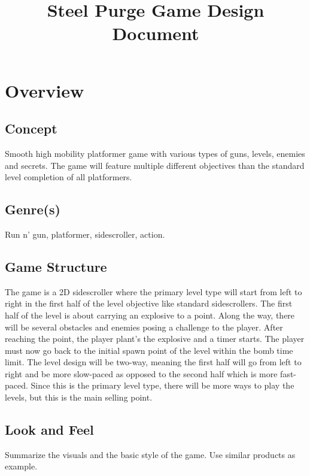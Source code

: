 \documentclass[12pt]{article}
\title{Steel Purge Game Design Document}
\begin{document}
\maketitle{}

\section{Overview}


\subsection{Concept}

Smooth high mobility platformer game with various types of guns, levels, enemies and secrets. The game will feature multiple different objectives than the standard level completion of all platformers. 

\subsection{Genre(s)}

Run n' gun, platformer, sidescroller, action.

\subsection{Game Structure}

The game is a 2D sidescroller where the primary level type will start from left to right in the first half of the level objective like standard sidescrollers. The first half of the level is about carrying an explosive to a point. Along the way, there will be several obstacles and enemies posing a challenge to the player. After reaching the point, the player plant's the explosive and a timer starts. The player must now go back to the initial spawn point of the level within the bomb time limit. The level design will be two-way, meaning the first half will go from left to right and be more slow-paced as opposed to the second half which is more fast-paced. Since this is the primary level type, there will be more ways to play the levels, but this is the main selling point. 

\subsection{Look and Feel}

Summarize the visuals and the basic style of the game. Use similar products as example. 
\end{document}
